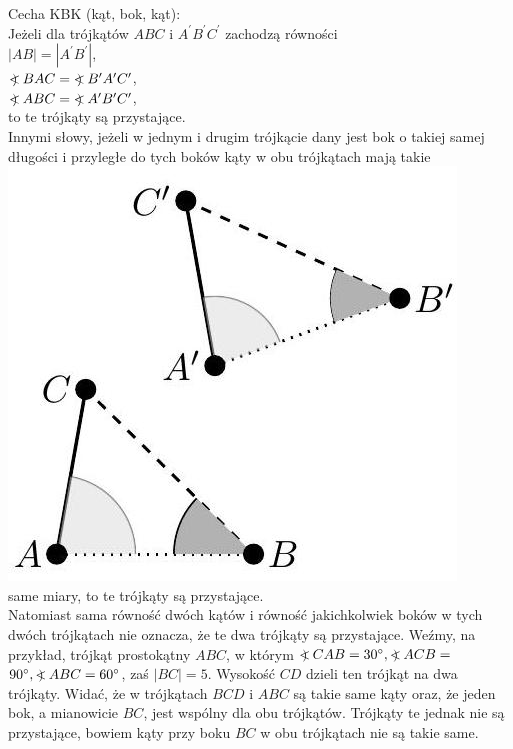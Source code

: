 \documentclass[10pt]{article}
\newcommand\Varangle{\mathop{{<\!\!\!\!\!\text{\small)}}\:}\nolimits}
\begin{document}
Cecha KBK (kąt, bok, kąt):\\
Jeżeli dla trójkątów \(A B C\) i \(A^{\prime} B^{\prime} C^{\prime}\) zachodzą równości\\
\(|A B|=\left|A^{\prime} B^{\prime}\right|\),\\
\(\Varangle B A C=\Varangle B^{\prime} A^{\prime} C^{\prime}\),\\
\(\Varangle A B C=\Varangle A^{\prime} B^{\prime} C^{\prime}\),\\
to te trójkąty są przystające.\\
Innymi słowy, jeżeli w jednym i drugim trójkącie dany jest bok o takiej samej długości i przyległe do tych boków kąty w obu trójkątach mają takie\\
\includegraphics[max width=\textwidth, center]{2024_11_21_71f62bd117d375398909g-047(2)}\\
same miary, to te trójkąty są przystające.\\
Natomiast sama równość dwóch kątów i równość jakichkolwiek boków w tych dwóch trójkątach nie oznacza, że te dwa trójkąty są przystające. Weźmy, na przykład, trójkąt prostokątny \(A B C\), w którym \(\Varangle C A B=30^{\circ}, \Varangle A C B=\) \(90^{\circ}, \Varangle A B C=60^{\circ}\), zaś \(|B C|=5\). Wysokość \(C D\) dzieli ten trójkąt na dwa trójkąty. Widać, że w trójkątach \(B C D\) i \(A B C\) są takie same kąty oraz, że jeden bok, a mianowicie \(B C\), jest wspólny dla obu trójkątów. Trójkąty te jednak nie są przystające, bowiem kąty przy boku \(B C\) w obu trójkątach nie są takie same.\\
\end{document}
